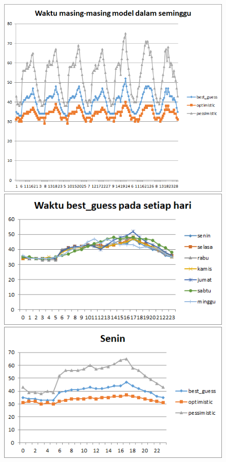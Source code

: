 \begin{figure}[H]
				\centering		
				\includegraphics[scale=0.7]{Gambar/waktuallmodelsampel217072017reverse.png}
				\includegraphics[]{Gambar/waktubestguesssampel217072017reverse.png}
				\includegraphics[]{Gambar/seninsampel217072017reverse.png}
\end{figure}
			
